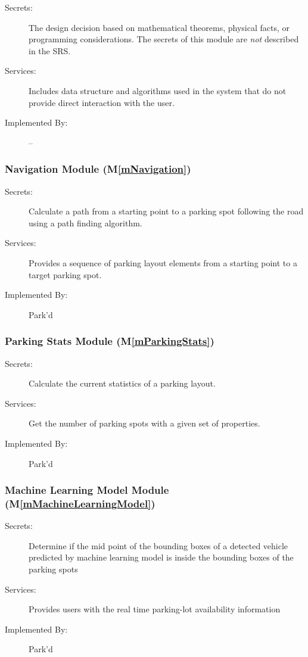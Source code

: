 \documentclass[12pt, titlepage]{article}
\newcommand{\mref}[1]{M\ref{#1}}
\begin{document}
\begin{description}
\item[Secrets:] The design decision based on mathematical theorems, physical
  facts, or programming considerations. The secrets of this module are
  \emph{not} described in the SRS.
\item[Services:] Includes data structure and algorithms used in the system that
  do not provide direct interaction with the user. 
\item[Implemented By:] --
\end{description}

\subsubsection{Navigation Module (\mref{mNavigation})}
\begin{description}
\item[Secrets:] Calculate a path from a starting point to a parking spot
following the road using a path finding algorithm.
\item[Services:] Provides a sequence of parking layout elements from a starting
point to a target parking spot.
\item[Implemented By:] Park'd
\end{description}

\subsubsection{Parking Stats Module (\mref{mParkingStats})}
\begin{description}
\item[Secrets:] Calculate the current statistics of a parking layout.
\item[Services:] Get the number of parking spots with a given set of properties.
\item[Implemented By:] Park'd
\end{description}

\subsubsection{Machine Learning Model Module (\mref{mMachineLearningModel})}
\begin{description}
    \item[Secrets:]{\color{red} Determine if the mid point of the bounding boxes
    of a detected vehicle predicted by machine learning model is inside the
    bounding boxes of the parking spots}
\item[Services:] Provides users with the real time parking-lot availability
information 
\item[Implemented By:] Park'd
\end{description}
\color{red}
\end{document}
